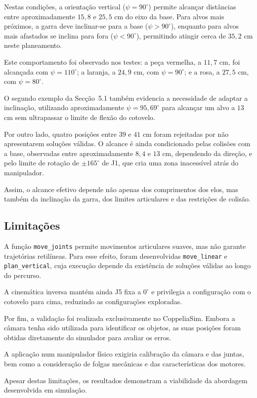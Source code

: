 Nestas condições, a orientação vertical ($\psi=90^\circ$) permite alcançar distâncias entre aproximadamente $15{,}8$ e $25{,}5$ cm do eixo da base. Para alvos mais próximos, a garra deve inclinar-se para a base ($\psi>90^\circ$), enquanto para alvos mais afastados se inclina para fora ($\psi<90^\circ$), permitindo atingir cerca de $35{,}2$ cm neste planeamento.

Este comportamento foi observado nos testes: a peça vermelha, a $11{,}7$ cm, foi alcançada com $\psi=110^\circ$; a laranja, a $24{,}9$ cm, com $\psi=90^\circ$; e a rosa, a $27{,}5$ cm, com $\psi=80^\circ$.

O segundo exemplo da Secção~5.1 também evidencia a necessidade de adaptar a inclinação, utilizando aproximadamente $\psi=95{,}69^\circ$ para alcançar um alvo a $13$ cm sem ultrapassar o limite de flexão do cotovelo.

Por outro lado, quatro posições entre $39$ e $41$ cm foram rejeitadas por não apresentarem soluções válidas. O alcance é ainda condicionado pelas colisões com a base, observadas entre aproximadamente $8{,}4$ e $13$ cm, dependendo da direção, e pelo limite de rotação de $\pm165^\circ$ de J1, que cria uma zona inacessível atrás do manipulador.

Assim, o alcance efetivo depende não apenas dos comprimentos dos elos, mas também da inclinação da garra, dos limites articulares e das restrições de colisão.

\subsection{Limitações}

A função \texttt{move\_joints} permite movimentos articulares suaves, mas não garante trajetórias retilíneas. Para esse efeito, foram desenvolvidas \texttt{move\_linear} e \texttt{plan\_vertical}, cuja execução depende da existência de soluções válidas ao longo do percurso.

A cinemática inversa mantém ainda J5 fixa a $0^\circ$ e privilegia a configuração com o cotovelo para cima, reduzindo as configurações exploradas.

Por fim, a validação foi realizada exclusivamente no CoppeliaSim. Embora a câmara tenha sido utilizada para identificar os objetos, as suas posições foram obtidas diretamente do simulador para avaliar os erros.

A aplicação num manipulador físico exigiria calibração da câmara e das juntas, bem como a consideração de folgas mecânicas e das características dos motores.

Apesar destas limitações, os resultados demonstram a viabilidade da abordagem desenvolvida em simulação.
